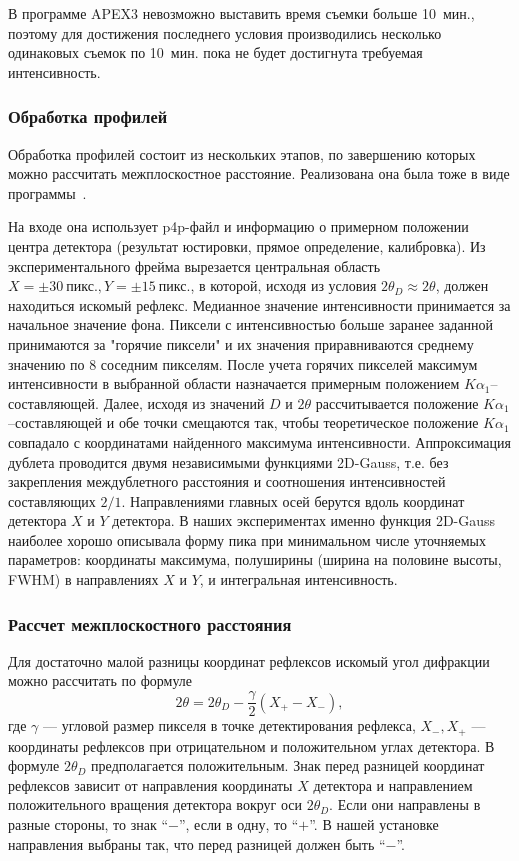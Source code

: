 \documentclass[a4paper,14pt]{extarticle}
\newcommand{\unit}[1]{ \ \text{#1}}
\newcounter{x}
\begin{document}
В программе APEX3 невозможно выставить время съемки больше 10~мин., поэтому для достижения последнего условия производились несколько одинаковых съемок по 10~мин. пока не будет достигнута требуемая интенсивность.
\subsubsection{Обработка профилей}
Обработка профилей состоит из нескольких этапов, по завершению которых можно рассчитать межплоскостное расстояние.
Реализована она была тоже в виде программы~\cite{Kudryavtsev:2024:eccentr}.

На входе она использует p4p-файл и информацию о примерном положении центра детектора (результат юстировки, прямое определение, калибровка).
Из экспериментального фрейма вырезается центральная область $X = \pm 30\unit{пикс.}, Y = \pm 15\unit{пикс.}$, в которой, исходя из условия $2\theta_D \approx 2\theta$, должен находиться искомый рефлекс.
Медианное значение интенсивности принимается за начальное значение фона.
Пиксели с интенсивностью больше заранее заданной принимаются за "горячие пиксели" и их значения приравниваются среднему значению по 8 соседним пикселям.
После учета горячих пикселей максимум интенсивности в выбранной области назначается примерным положением $K\alpha_1$--составляющей.
Далее, исходя из значений $D$ и $2\theta$ рассчитывается положение $K\alpha_1$--составляющей и обе точки смещаются так, чтобы теоретическое положение $K\alpha_1$ совпадало с координатами найденного максимума интенсивности.
Аппроксимация дублета проводится двумя независимыми  функциями 2D-Gauss, т.е. без закрепления междублетного расстояния и соотношения интенсивностей составляющих $2/1$.
Направлениями главных осей берутся вдоль координат детектора $X$ и $Y$ детектора.
В наших экспериментах именно функция 2D-Gauss наиболее хорошо описывала форму пика при минимальном числе уточняемых параметров: координаты максимума, полуширины (ширина на половине высоты, FWHM) в направлениях $X$ и $Y$, и интегральная интенсивность.
\subsubsection{Рассчет межплоскостного расстояния}
Для достаточно малой разницы координат рефлексов искомый угол дифракции можно рассчитать по формуле
\begin{equation} \label{eq:bond2}
    2\theta = 2\theta_D - \frac{\gamma}{2} (X_{+} - X_{-}),
\end{equation}
где $\gamma$ --- угловой размер пикселя в точке детектирования рефлекса, $X_{-}, X_{+}$ --- координаты рефлексов при отрицательном и положительном углах детектора.
В формуле $2\theta_D$ предполагается положительным.
Знак перед разницей координат рефлексов зависит от направления координаты $X$ детектора и направлением положительного вращения детектора вокруг оси $2\theta_D$.
Если они направлены в разные стороны, то знак ``$-$'', если в одну, то ``$+$''.
В нашей установке направления выбраны так, что перед разницей должен быть ``$-$''.
\end{document}
